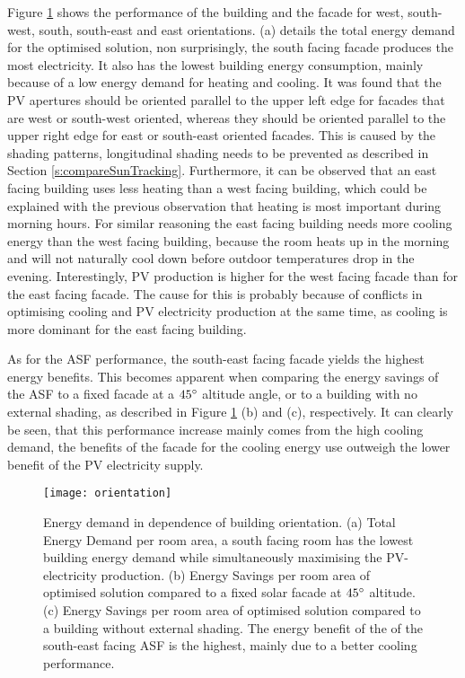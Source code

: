 	Figure \ref{fig:buildingOrientation} shows the performance of the building and the facade for west, south-west, south, south-east and east orientations. (a) details the total energy demand for the optimised solution, non surprisingly, the south facing facade produces the most electricity. It also has the lowest building energy consumption, mainly because of a low energy demand for heating and cooling. It was found that the PV apertures should be oriented parallel to the upper left edge for facades that are west or south-west oriented, whereas they should be oriented parallel to the upper right edge for east or south-east oriented facades. This is caused by the shading patterns, longitudinal shading needs to be prevented as described in Section \ref{s:compareSunTracking}. Furthermore, it can be observed that an east facing building uses less heating than a west facing building, which could be explained with the previous observation that heating is most important during morning hours. For similar reasoning the east facing building needs more cooling energy than the west facing building, because the room heats up in the morning and will not naturally cool down before outdoor temperatures drop in the evening. Interestingly, PV production is higher for the west facing facade than for the east facing facade. The cause for this is probably because of conflicts in optimising cooling and PV electricity production at the same time, as cooling is more dominant for the east facing building. 

	As for the ASF performance, the south-east facing facade yields the highest energy benefits. This becomes apparent when comparing the energy savings of the ASF to a fixed facade at a $45\degree$ altitude angle, or to a building with no external shading, as described in Figure \ref{fig:buildingOrientation} (b) and (c), respectively. It can clearly be seen, that this performance increase mainly comes from the high cooling demand, the benefits of the facade for the cooling energy use outweigh the lower benefit of the PV electricity supply. 

	\begin{figure*}
		\begin{center}
		\texttt{[image: orientation]}
		\caption{Energy demand in dependence of building orientation. (a) Total Energy Demand per room area, a south facing room has the lowest building energy demand while simultaneously maximising the PV-electricity production. (b) Energy Savings per room area of optimised solution compared to a fixed solar facade at $45\degree$ altitude. (c) Energy Savings per room area of optimised solution compared to a building without external shading. The energy benefit of the of the south-east facing ASF is the highest, mainly due to a better cooling performance.}
		\label{fig:buildingOrientation}
		\end{center}
	\end{figure*}


